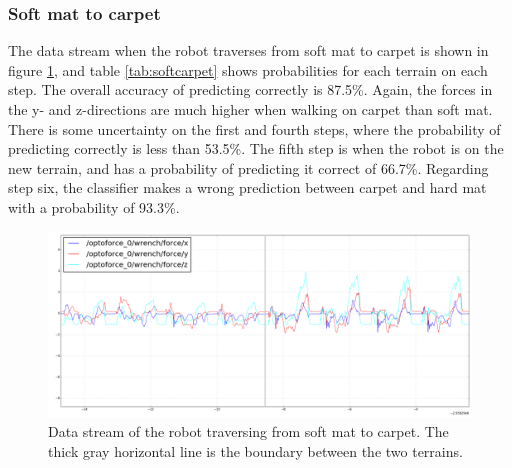 \documentclass[USenglish]{ifimaster}  %
\begin{document}
\subsubsection{Soft mat to carpet}
The data stream when the robot traverses from soft mat to carpet is shown in figure \ref{fig:softcarpet}, and table \ref{tab:softcarpet} shows probabilities for each terrain on each step. The overall accuracy of predicting correctly is 87.5\%. Again, the forces in the y- and z-directions are much higher when walking on carpet than soft mat. There is some uncertainty on the first and fourth steps, where the probability of predicting correctly is less than 53.5\%. The fifth step is when the robot is on the new terrain, and has a probability of predicting it correct of 66.7\%. Regarding step six, the classifier makes a wrong prediction between carpet and hard mat with a probability of 93.3\%.
	
	
	\begin{figure}[h]
		\centering
		\includegraphics[width=\textwidth,height=\textheight,keepaspectratio]{Figures/MM4Teppe2_line2}
		\caption[Data stream of the transition from soft mat to carpet.]{Data stream of the robot traversing from soft mat to carpet. The thick gray horizontal line is the boundary between the two terrains.}
		\label{fig:softcarpet}
	\end{figure}
	
\end{document}
